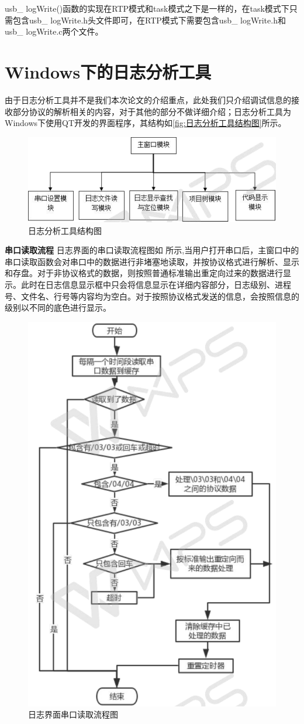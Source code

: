 usb\_ logWrite()函数的实现在RTP模式和task模式之下是一样的，在task模式下只需包含usb\_ logWrite.h头文件即可，在RTP模式下需要包含usb\_ logWrite.h和usb\_ logWrite.c两个文件。


\section{Windows下的日志分析工具}
	
	由于日志分析工具并不是我们本次论文的介绍重点，此处我们只介绍调试信息的接收部分协议的解析相关的内容，对于其他的部分不做详细介绍；日志分析工具为Windows下使用QT开发的界面程序，其结构如\autoref{fig:日志分析工具结构图}所示。
\begin{figure}[!h]
\centering
\includegraphics[width=1.0\textwidth]{./graphics/routonLog-system-structure.pdf}
\caption{日志分析工具结构图}\label{fig:日志分析工具结构图}
\end{figure}

\textbf{串口读取流程}
日志界面的串口读取流程图如 所示,当用户打开串口后，主窗口中的串口读取函数会对串口中的数据进行非堵塞地读取，并按协议格式进行解析、显示和存盘。对于非协议格式的数据，则按照普通标准输出重定向过来的数据进行显示。此时在日志信息显示框中只会将信息显示在详细内容部分，日志级别、进程号、文件名、行号等内容均为空白。对于按照协议格式发送的信息，会按照信息的级别以不同的底色进行显示。
\begin{figure}[!h]
\centering
\includegraphics[width=.6\textwidth]{./graphics/LogTTYRead.pdf}
\caption{日志界面串口读取流程图}\label{fig:串口读取流程图}
\end{figure}


